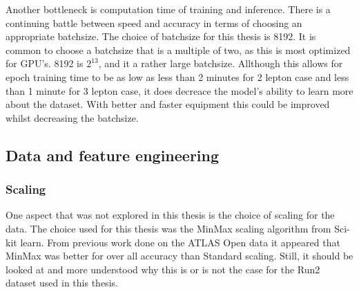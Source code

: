 Another bottleneck is computation time of training and inference. 
There is a continuing battle between speed and accuracy in terms of choosing an appropriate batchsize. 
The choice of batchsize for this thesis is 8192. It is common to choose a batchsize that is a multiple of two, 
as this is most optimized for GPU's. 8192 is $2^{13}$, and it a rather large batchsize. Allthough this allows for 
epoch training time to be as low as less than 2 minutes for 2 lepton case and less than 1 minute for 3 lepton case,
it does decreace the model's ability to learn more about the dataset\cite{Goodfellow-et-al-2016}. With better and faster equipment this could 
be improved whilst decreasing the batchsize. 


\subsection*{Data and feature engineering}
\subsubsection*{Scaling}
One aspect that was not explored in this thesis is the choice of scaling for the data. The choice used for this 
thesis was the MinMax scaling algorithm from Sci-kit learn. From previous work done on the ATLAS Open data 
\cite{ATL-OREACH-PUB-2020-001} it appeared that MinMax was better for over all accuracy than Standard scaling.
Still, it should be looked at and more understood why this is or is not the case for the Run2 dataset used in this 
thesis. 

